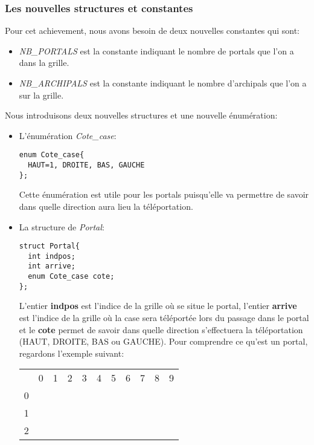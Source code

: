 \subsubsection{Les nouvelles structures et constantes}
Pour cet achievement, nous avons besoin de deux nouvelles constantes qui sont:
\begin{itemize}
\item \textit{NB\_PORTALS} est la constante indiquant le nombre de portals que l'on a dans la grille.
\item \textit{NB\_ARCHIPALS} est la constante indiquant le nombre d'archipals que l'on a sur la grille. 
\end{itemize} 
\vspace{0.3cm}
Nous introduisons deux nouvelles structures et une nouvelle énumération:
\begin{itemize}
\item L'énumération \textit{Cote\_case}:
\begin{lstlisting}
enum Cote_case{
  HAUT=1, DROITE, BAS, GAUCHE
};
\end{lstlisting}
Cette énumération est utile pour les portals puisqu'elle va permettre de savoir dans quelle direction aura lieu la téléportation. \\
\item La structure de \textit{Portal}:
\begin{lstlisting}
struct Portal{
  int indpos;
  int arrive;
  enum Cote_case cote;
};
\end{lstlisting}
L'entier \textbf{indpos} est l'indice de la grille où se situe le portal, l'entier \textbf{arrive} est l'indice de la grille où la case sera téléportée lors du passage dans le portal et le \textbf{cote} permet de savoir dans quelle direction s'effectuera la téléportation (HAUT, DROITE, BAS ou GAUCHE).
\newpage
Pour comprendre ce qu'est un portal, regardons l'exemple suivant: \\
\begin{center}
\begin{tabular}[t]{c|c|c|c|c|c|c|c|c|c|c|}
  \multicolumn{1}{c}{} & \multicolumn{1}{c}{0} & \multicolumn{1}{c}{1} & \multicolumn{1}{c}{2} & \multicolumn{1}{c}{3} & \multicolumn{1}{c}{4} & \multicolumn{1}{c}{5} & \multicolumn{1}{c}{6} & \multicolumn{1}{c}{7} & \multicolumn{1}{c}{8} & \multicolumn{1}{c}{9} \\ 
 \cline{2-11} 0 & & & & & & & & & \cellcolor{red} & \\
 \cline{2-11} 1 & & & & & & & & & & \\
 \cline{2-11} 2 & & & & & & & & & & \\

\end{tabular}
\end{center}
\end{itemize}
